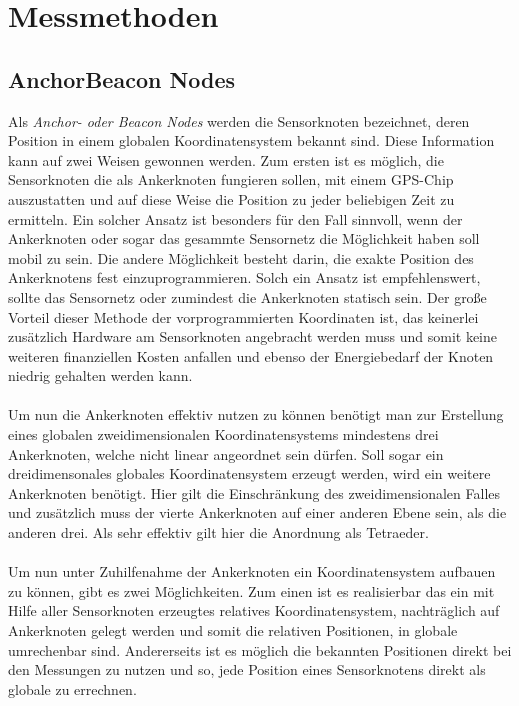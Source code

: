\section{Messmethoden}
\subsection{Anchor\/Beacon Nodes}

Als \textit{Anchor- oder Beacon Nodes} werden die Sensorknoten bezeichnet, deren Position in einem globalen Koordinatensystem bekannt sind.
Diese Information kann auf zwei Weisen gewonnen werden. Zum ersten ist es möglich, die Sensorknoten die als Ankerknoten fungieren sollen, 
mit einem GPS-Chip auszustatten und auf diese Weise die Position zu jeder beliebigen Zeit zu ermitteln. Ein solcher Ansatz ist besonders
für den Fall sinnvoll, wenn der Ankerknoten oder sogar das gesammte Sensornetz die Möglichkeit haben soll mobil zu sein. 
Die andere Möglichkeit besteht darin, die exakte Position des Ankerknotens fest einzuprogrammieren. Solch ein Ansatz ist empfehlenswert,
sollte das Sensornetz oder zumindest die Ankerknoten statisch sein. Der große Vorteil dieser Methode der vorprogrammierten Koordinaten ist,
das keinerlei zusätzlich Hardware am Sensorknoten angebracht werden muss und somit keine weiteren finanziellen Kosten anfallen und ebenso der
Energiebedarf der Knoten niedrig gehalten werden kann. \\~\\
Um nun die Ankerknoten effektiv nutzen zu können benötigt man zur Erstellung eines globalen zweidimensionalen Koordinatensystems mindestens
drei Ankerknoten, welche nicht linear angeordnet sein dürfen. Soll sogar ein dreidimensonales globales Koordinatensystem erzeugt werden, wird
ein weitere Ankerknoten benötigt. Hier gilt die Einschränkung des zweidimensionalen Falles und zusätzlich muss der vierte Ankerknoten auf einer
anderen Ebene sein, als die anderen drei. Als sehr effektiv gilt hier die Anordnung als Tetraeder. \\~\\
Um nun unter Zuhilfenahme der Ankerknoten ein Koordinatensystem aufbauen zu können, gibt es zwei Möglichkeiten. Zum einen ist es realisierbar das 
ein mit Hilfe aller Sensorknoten erzeugtes relatives Koordinatensystem, nachträglich auf Ankerknoten gelegt werden und somit die relativen Positionen, 
in globale umrechenbar sind. Andererseits ist es möglich die bekannten Positionen direkt bei den Messungen zu nutzen und so, jede Position eines
Sensorknotens direkt als globale zu errechnen. 

